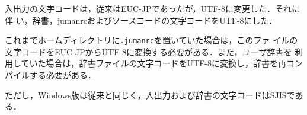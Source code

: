 \documentclass[a4j,titlepage]{jarticle}
\begin{document}
入出力の文字コードは，従来はEUC-JPであったが，UTF-8に変更した．それに伴
い，辞書，jumanrcおよびソースコードの文字コードをUTF-8にした．

これまでホームディレクトリに\texttt{.jumanrc}を置いていた場合は，このファ
イルの文字コードをEUC-JPからUTF-8に変換する必要がある．また，ユーザ辞書を
利用していた場合は，辞書ファイルの文字コードをUTF-8に変換し，辞書を再コン
パイルする必要がある．

ただし，Windows版は従来と同じく，入出力および辞書の文字コードはSJISであ
る．

\end{document}
